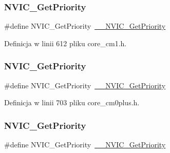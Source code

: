 \subsubsection{\texorpdfstring{N\+V\+I\+C\+\_\+\+Get\+Priority}{NVIC\_GetPriority}\hspace{0.1cm}{\footnotesize\ttfamily [2/12]}}
{\footnotesize\ttfamily \#define N\+V\+I\+C\+\_\+\+Get\+Priority~\hyperlink{group___c_m_s_i_s___core___n_v_i_c_functions_gaeb9dc99c8e7700668813144261b0bc73}{\+\_\+\+\_\+\+N\+V\+I\+C\+\_\+\+Get\+Priority}}



Definicja w linii 612 pliku core\+\_\+cm1.\+h.

\mbox{\label{group___c_m_s_i_s___core___n_v_i_c_functions_gaf59b9d0a791d2157abb319753953eceb}} 
\subsubsection{\texorpdfstring{N\+V\+I\+C\+\_\+\+Get\+Priority}{NVIC\_GetPriority}\hspace{0.1cm}{\footnotesize\ttfamily [3/12]}}
{\footnotesize\ttfamily \#define N\+V\+I\+C\+\_\+\+Get\+Priority~\hyperlink{group___c_m_s_i_s___core___n_v_i_c_functions_gaeb9dc99c8e7700668813144261b0bc73}{\+\_\+\+\_\+\+N\+V\+I\+C\+\_\+\+Get\+Priority}}



Definicja w linii 703 pliku core\+\_\+cm0plus.\+h.

\mbox{\label{group___c_m_s_i_s___core___n_v_i_c_functions_gaf59b9d0a791d2157abb319753953eceb}} 
\subsubsection{\texorpdfstring{N\+V\+I\+C\+\_\+\+Get\+Priority}{NVIC\_GetPriority}\hspace{0.1cm}{\footnotesize\ttfamily [4/12]}}
{\footnotesize\ttfamily \#define N\+V\+I\+C\+\_\+\+Get\+Priority~\hyperlink{group___c_m_s_i_s___core___n_v_i_c_functions_gaeb9dc99c8e7700668813144261b0bc73}{\+\_\+\+\_\+\+N\+V\+I\+C\+\_\+\+Get\+Priority}}



